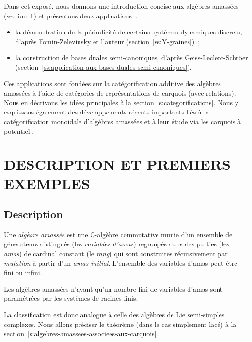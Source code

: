 \documentclass[brochure,12pt]{bourbaki}
\numberwithin{equation}{subsection}
\numberwithin{theorem}{section}
\newcommand{\Q}{\mathbb{Q}}
\begin{document}
Dans cet expos\'e, nous donnons une introduction concise
aux alg\`ebres amass\'ees (section~1) et pr\'esentons deux applications~:
\begin{itemize}

\item la d\'emonstration de la p\'eriodicit\'e de certains
syst\`emes dynamiques discrets, d'apr\`es
Fomin-Zelevinsky \cite{FominZelevinsky03b} et l'auteur \cite{Keller08c} \cite{Keller10a}
(section~\ref{ss:Y-graines})~;

\item la construction de bases duales semi-canoniques,
d'apr\`es Geiss-Leclerc-Schr\"oer \cite{GeissLeclercSchroeer06}
(section~\ref{ss:application-aux-bases-duales-semi-canoniques}).

\end{itemize}
Ces applications sont fond\'ees sur la cat\'egorification additive des
alg\`ebres amass\'ees \`a l'aide de cat\'egories de repr\'esentations
de carquois (avec relations).  Nous en d\'ecrivons les id\'ees
principales \`a la section~\ref{s:categorifications}. Nous y
esquissons \'egalement des d\'eveloppements r\'ecents importants li\'es \`a la
cat\'egorification mono\"{\i}dale d'alg\`ebres amass\'ees
\cite{HernandezLeclerc09} \cite{Nakajima09} et \`a leur \'etude via
les carquois \`a potentiel \cite{DerksenWeymanZelevinsky08}
\cite{DerksenWeymanZelevinsky09}.


\section{DESCRIPTION ET PREMIERS EXEMPLES}
\subsection{Description}
Une {\em alg\`ebre amass\'ee} est une $\Q$-alg\`ebre commutative munie
d'un ensemble de g\'en\'erateurs distingu\'es (les {\em variables d'amas})
regroup\'es dans des parties (les {\em amas}) de cardinal constant
(le {\em rang}) qui sont construites r\'ecursivement par {\em mutation}
\`a partir d'un {\em amas initial}.
L'ensemble des variables d'amas peut \^etre fini ou infini.

\begin{theo} Les alg\`ebres amass\'ees
n'ayant qu'un nombre fini de variables d'amas sont param\'etr\'ees par
les syst\`emes de racines finis.
\end{theo}

La classification est donc analogue \`a celle des alg\`ebres
de Lie semi-simples complexes.
Nous allons pr\'eciser le th\'eor\`eme (dans le cas simplement lac\'e)
\`a la section~\ref{s:algebres-amassees-associees-aux-carquois}.
\end{document}

